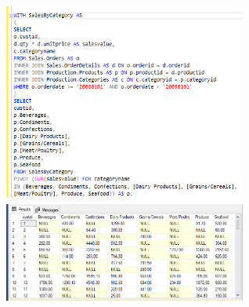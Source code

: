\begin{enumerate}[1.]
\begin{enumerate}[a)]
\begin{figure}[H]
		\begin{center}
		\includegraphics[width=8cm]{./Imagenes/3-2}\\
		\includegraphics[width=8cm]{./Imagenes/3-3}
		\end{center}
		\end{figure}
	\end{enumerate}


\end{enumerate}
